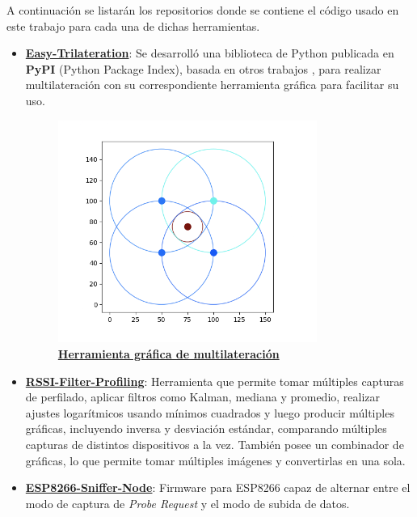 A continuación se listarán los repositorios donde se contiene el código usado en este trabajo para cada una de dichas herramientas.
\begin{itemize}
    \item \href{https://pypi.org/project/easy-trilateration/#description}{\textbf{Easy-Trilateration}}: Se desarrolló una biblioteca de Python publicada en \textbf{PyPI} (Python Package Index), basada en otros trabajos \cite{madfolio}, para realizar multilateración con su correspondiente herramienta gráfica para facilitar su uso.

    \begin{figure}[th]
        \centering
        \includegraphics[width=0.8\textwidth]{Figuras/easy_trilateration.png}
        \captionsetup{margin=2cm}
        \caption[Herramienta gráfica de multilateración]{\href{https://github.com/agusalex/easy-trilateration}{\textbf{Herramienta gráfica de multilateración}}}
        \label{fig:libpython}
    \end{figure}

    \item \href{https://github.com/agusalex/rssi-filter-profiling}{\textbf{RSSI-Filter-Profiling}}: Herramienta que permite tomar múltiples capturas de perfilado, aplicar filtros como Kalman, mediana y promedio, realizar ajustes logarítmicos usando mínimos cuadrados y luego producir múltiples gráficas, incluyendo inversa y desviación estándar, comparando múltiples capturas de distintos dispositivos a la vez. También posee un combinador de gráficas, lo que permite tomar múltiples imágenes y convertirlas en una sola.

    \item \href{https://github.com/agusalex/ESP8266-sniffer-node}{\textbf{ESP8266-Sniffer-Node}}: Firmware para ESP8266 capaz de alternar entre el modo de captura de \textit{Probe Request} y el modo de subida de datos.


\end{itemize}
